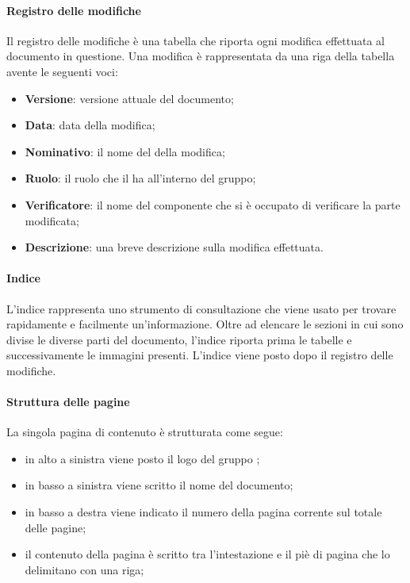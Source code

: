 \paragraph{Registro delle modifiche}
Il registro delle modifiche è una tabella che riporta ogni modifica effettuata al documento in questione. Una modifica è rappresentata da una riga della tabella avente le seguenti voci:
\begin{itemize}

	\item \textbf{Versione}: versione attuale del documento;
	
	\item \textbf{Data}: data della modifica;
	
	\item \textbf{Nominativo}: il nome del  della modifica;
	
	\item \textbf{Ruolo}: il ruolo che il  ha all'interno del gruppo;
	
	\item \textbf{Verificatore}: il nome del componente che si è occupato di verificare la parte modificata;
	
	\item \textbf{Descrizione}: una breve descrizione sulla modifica effettuata.
\end{itemize}

\paragraph{Indice}
L'indice rappresenta uno strumento di consultazione che viene usato per trovare rapidamente e facilmente un'informazione. Oltre ad elencare le sezioni in cui sono divise le diverse parti del documento, l'indice riporta prima le tabelle e successivamente le immagini presenti. L'indice viene posto dopo il registro delle modifiche.

\paragraph{Struttura delle pagine}
La singola pagina di contenuto è strutturata come segue:
\begin{itemize}

	\item in alto a sinistra viene posto il logo del gruppo \Gruppo{};
	
	\item in basso a sinistra viene scritto il nome del documento;
	
	\item in basso a destra viene indicato il numero della pagina corrente sul totale delle pagine;
	
	\item il contenuto della pagina è scritto tra l'intestazione e il piè di pagina che lo delimitano con una riga;
\end{itemize}

